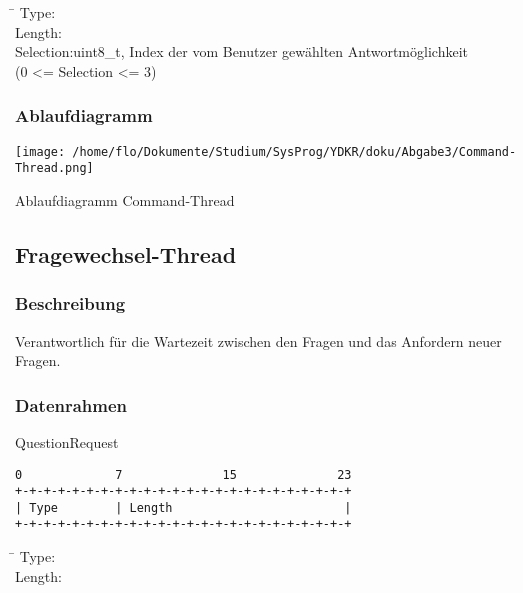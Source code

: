\documentclass[a4paper,10pt]{article}
\begin{document}
\begin{tabbing}
\hspace{2 cm}\=\kill
Type:\\
Length:\\
Selection:\>uint8\_t, Index der vom Benutzer gewählten Antwortmöglichkeit \\
\>(0 <= Selection <= 3)\\
\end{tabbing}

\subsubsection{Ablaufdiagramm}

\begin{center}
 \texttt{[image: /home/flo/Dokumente/Studium/SysProg/YDKR/doku/Abgabe3/Command-Thread.png]}
\end{center}

Ablaufdiagramm Command-Thread

\subsection{Fragewechsel-Thread}

\subsubsection{Beschreibung}

Verantwortlich für die Wartezeit zwischen den Fragen und das Anfordern neuer Fragen.

\newpage

\subsubsection{Datenrahmen}

QuestionRequest

\begin{Verbatim}[fontfamily=courier]
0             7              15              23
+-+-+-+-+-+-+-+-+-+-+-+-+-+-+-+-+-+-+-+-+-+-+-+
| Type        | Length                        |
+-+-+-+-+-+-+-+-+-+-+-+-+-+-+-+-+-+-+-+-+-+-+-+
\end{Verbatim}

\begin{tabbing}
\hspace{2 cm}\=\kill
Type:\\
Length:\\
\end{tabbing}
\end{document}
